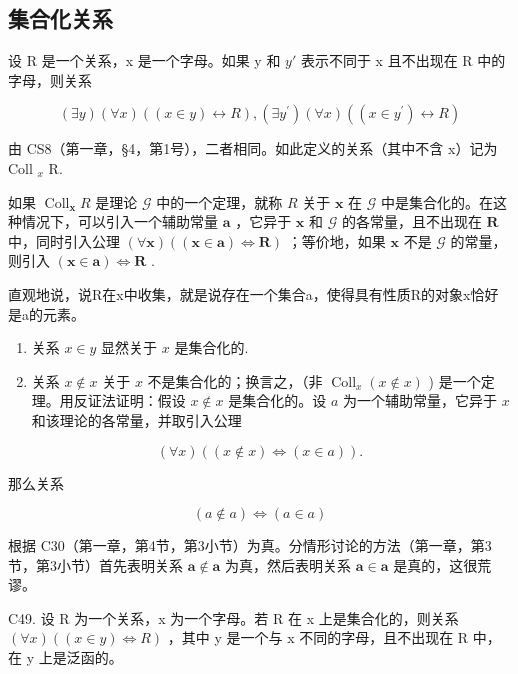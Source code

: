 \subsection{集合化关系}

设 R 是一个关系，x 是一个字母。如果 y 和 \(y'\) 表示不同于 x 且不出现在 R 中的字母，则关系

\[
(\exists y) (\forall x) ((x \in y) \leftrightarrow R), (\exists y ^ {\prime}) (\forall x) ((x \in y ^ {\prime}) \leftrightarrow R)
\]

由 CS8（第一章，§4，第1号），二者相同。如此定义的关系（其中不含 x）记为 Coll \(_{x}\) R.

如果 \(\operatorname{Coll}_{\mathbf{x}} R\) 是理论 \(\mathcal{G}\) 中的一个定理，就称 \(R\) 关于 \(\mathbf{x}\) 在 \(\mathcal{G}\) 中是集合化的。在这种情况下，可以引入一个辅助常量 \(\mathbf{a}\) ，它异于 \(\mathbf{x}\) 和 \(\mathcal{G}\) 的各常量，且不出现在 \(\mathbf{R}\) 中，同时引入公理 \((\forall \mathbf{x}) ((\mathbf{x} \in \mathbf{a}) \Longleftrightarrow \mathbf{R})\) ；等价地，如果 \(\mathbf{x}\) 不是 \(\mathcal{G}\) 的常量，则引入 \((\mathbf{x} \in \mathbf{a}) \Longleftrightarrow \mathbf{R}\) .

直观地说，说R在x中收集，就是说存在一个集合a，使得具有性质R的对象x恰好是a的元素。


\begin{enumerate}
\def\labelenumi{(\arabic{enumi})}
\item
  关系 \(x \in y\) 显然关于 \(x\) 是集合化的.
\item
  关系 \(x \notin x\) 关于 \(x\) 不是集合化的；换言之，（非 \(\operatorname{Coll}_x(x \notin x)\) ) 是一个定理。用反证法证明：假设 \(x \notin x\) 是集合化的。设 \(a\) 为一个辅助常量，它异于 \(x\) 和该理论的各常量，并取引入公理
\end{enumerate}

\[
(\forall x) ((x \notin x) \iff (x \in a)).
\]

那么关系

\[
(a \notin a) \iff (a \in a)
\]

根据 C30（第一章，第4节，第3小节）为真。分情形讨论的方法（第一章，第3节，第3小节）首先表明关系 \(\pmb{a} \notin \pmb{a}\) 为真，然后表明关系 \(\pmb{a} \in \pmb{a}\) 是真的，这很荒谬。

C49. 设 R 为一个关系，x 为一个字母。若 R 在 x 上是集合化的，则关系 \((\forall x)((x \in y) \Longleftrightarrow R)\) ，其中 y 是一个与 x 不同的字母，且不出现在 R 中，在 y 上是泛函的。

